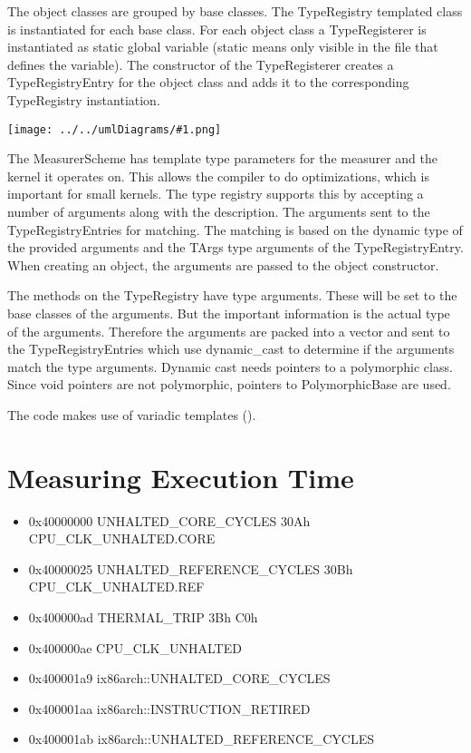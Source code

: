 \documentclass[a4paper,12pt]{article}
\newcommand{\umlDiagram}[1]{\begin{center}\texttt{[image: ../../umlDiagrams/\#1.png]}\end{center}}
\begin{document}
The object classes are grouped by base classes. The TypeRegistry templated class is instantiated for each base class. For each object class a TypeRegisterer is instantiated as static global variable (static means only visible in the file that defines the variable). The constructor of the TypeRegisterer creates a TypeRegistryEntry for the object class and adds it to the corresponding TypeRegistry instantiation.

\umlDiagram{TypeRegistry}

The MeasurerScheme has template type parameters for the measurer and the kernel it operates on. This allows the compiler to do optimizations, which is important for small kernels. The type registry supports this by accepting a number of arguments along with the description. The arguments sent to the TypeRegistryEntries for matching. The matching is based on the dynamic type of the provided arguments and the TArgs type arguments of the TypeRegistryEntry. When creating an object, the arguments are passed to the object constructor.

The methods on the TypeRegistry have type arguments. These will be set to the base classes of the arguments. But the important information is the actual type of the arguments. Therefore the arguments are packed into a vector and sent to the TypeRegistryEntries which use dynamic\_cast to determine if the arguments match the type arguments. Dynamic cast needs pointers to a polymorphic class. Since void pointers are not polymorphic, pointers to PolymorphicBase are used.

The code makes use of variadic templates (\cite{Gregor06:variadics_rev_3}).

\section{Measuring Execution Time}
\begin{itemize}
\item 0x40000000   UNHALTED\_CORE\_CYCLES 30Ah CPU\_CLK\_UNHALTED.CORE
\item 0x40000025   UNHALTED\_REFERENCE\_CYCLES 30Bh CPU\_CLK\_UNHALTED.REF
\item 0x400000ad   THERMAL\_TRIP 3Bh C0h 
\item 0x400000ae   CPU\_CLK\_UNHALTED
\item 0x400001a9   ix86arch::UNHALTED\_CORE\_CYCLES
\item 0x400001aa   ix86arch::INSTRUCTION\_RETIRED
\item 0x400001ab   ix86arch::UNHALTED\_REFERENCE\_CYCLES 
\end{itemize}
\end{document}
